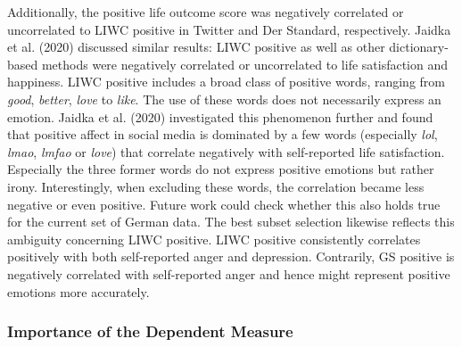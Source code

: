 \documentclass[
  english,
  jou,floatsintext]{apa7}
\begin{document}
Additionally, the positive life outcome score was negatively correlated or uncorrelated to LIWC positive in Twitter and Der Standard, respectively. Jaidka et al. (2020) discussed similar results: LIWC positive as well as other dictionary-based methods were negatively correlated or uncorrelated to life satisfaction and happiness. LIWC positive includes a broad class of positive words, ranging from \emph{good}, \emph{better}, \emph{love} to \emph{like}. The use of these words does not necessarily express an emotion. Jaidka et al. (2020) investigated this phenomenon further and found that positive affect in social media is dominated by a few words (especially \emph{lol}, \emph{lmao}, \emph{lmfao} or \emph{love}) that correlate negatively with self-reported life satisfaction. Especially the three former words do not express positive emotions but rather irony. Interestingly, when excluding these words, the correlation became less negative or even positive. Future work could check whether this also holds true for the current set of German data. The best subset selection likewise reflects this ambiguity concerning LIWC positive. LIWC positive consistently correlates positively with both self-reported anger and depression. Contrarily, GS positive is negatively correlated with self-reported anger and hence might represent positive emotions more accurately.

\hypertarget{importance-of-the-dependent-measure}{%
\subsubsection{Importance of the Dependent Measure}\label{importance-of-the-dependent-measure}}
\end{document}
